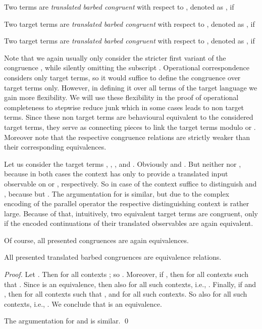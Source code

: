 \documentclass[]{llncs}
\begin{document}
\begin{definition} \label{def:transBarbCong}
	Two terms  are \emph{translated barbed congruent} with respect to , denoted as , if
	
	Two target terms  are \emph{translated barbed congruent} with respect to , denoted as , if
	
	Two target terms  are \emph{translated barbed congruent} with respect to , denoted as , if
	
\end{definition}
\noindent
Note that we again usually only consider the stricter first variant of the congruence , while silently omitting the subscript . Operational correspondence considers only target terms, so it would suffice to define the congruence over target terms only. However, in defining it over all terms of the target language we gain more flexibility. We will use these flexibility in the proof of operational completeness to stepwise reduce junk which in some cases leads to non target terms. Since these non target terms are behavioural equivalent to the considered target terms, they serve as connecting pieces to link the target terms modulo  or . Moreover note that the respective congruence relations are strictly weaker than their corresponding equivalences.
\begin{example}
	Let us consider the target terms , , , and . Obviously  and . But neither  nor , because in both cases the context has only to provide a translated input observable on  or , respectively. So in case of  the context  suffice to distinguish  and , because  but . The argumentation for  is similar, but due to the complex encoding of the parallel operator the respective distinguishing context is rather large. Because of that, intuitively, two equivalent target terms are congruent, only if the encoded continuations of their translated observables are again equivalent.
\end{example}

Of course, all presented congruences are again equivalences.

\begin{lemma} \label{lem:transBarbCongIsEquivalence}
	All presented translated barbed congruences are equivalence relations.
\end{lemma}

\begin{proof}
	Let . Then  for all contexts ; so . Moreover, if , then  for all contexts  such that . Since  is an equivalence, then also  for all such contexts, i.e., . Finally, if  and , then  for all contexts  such that , and  for all such contexts. So also  for all such contexts, i.e., . We conclude that  is an equivalence.
	
	The argumentation for  and  is similar.
	\qed
\end{proof}
\end{document}
